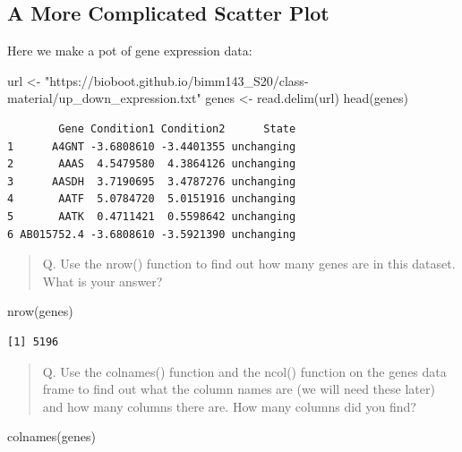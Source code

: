 \documentclass[
  letterpaper,
  DIV=11,
  numbers=noendperiod]{scrartcl}
\newenvironment{Shaded}{\begin{snugshade}}{\end{snugshade}}
\newcommand{\FunctionTok}[1]{\textcolor[rgb]{0.28,0.35,0.67}{#1}}
\newcommand{\NormalTok}[1]{\textcolor[rgb]{0.00,0.23,0.31}{#1}}
\newcommand{\OtherTok}[1]{\textcolor[rgb]{0.00,0.23,0.31}{#1}}
\newcommand{\StringTok}[1]{\textcolor[rgb]{0.13,0.47,0.30}{#1}}
\begin{document}
\hypertarget{a-more-complicated-scatter-plot}{%
\subsection{A More Complicated Scatter
Plot}\label{a-more-complicated-scatter-plot}}

Here we make a pot of gene expression data:

\begin{Shaded}
\begin{Highlighting}[]
\NormalTok{url }\OtherTok{\textless{}{-}} \StringTok{"https://bioboot.github.io/bimm143\_S20/class{-}material/up\_down\_expression.txt"}
\NormalTok{genes }\OtherTok{\textless{}{-}} \FunctionTok{read.delim}\NormalTok{(url)}
\FunctionTok{head}\NormalTok{(genes)}
\end{Highlighting}
\end{Shaded}

\begin{verbatim}
        Gene Condition1 Condition2      State
1      A4GNT -3.6808610 -3.4401355 unchanging
2       AAAS  4.5479580  4.3864126 unchanging
3      AASDH  3.7190695  3.4787276 unchanging
4       AATF  5.0784720  5.0151916 unchanging
5       AATK  0.4711421  0.5598642 unchanging
6 AB015752.4 -3.6808610 -3.5921390 unchanging
\end{verbatim}

\begin{quote}
Q. Use the nrow() function to find out how many genes are in this
dataset. What is your answer?
\end{quote}

\begin{Shaded}
\begin{Highlighting}[]
\FunctionTok{nrow}\NormalTok{(genes)}
\end{Highlighting}
\end{Shaded}

\begin{verbatim}
[1] 5196
\end{verbatim}

\begin{quote}
Q. Use the colnames() function and the ncol() function on the genes data
frame to find out what the column names are (we will need these later)
and how many columns there are. How many columns did you find?
\end{quote}

\begin{Shaded}
\begin{Highlighting}[]
\FunctionTok{colnames}\NormalTok{(genes)}
\end{Highlighting}
\end{Shaded}
\end{document}
